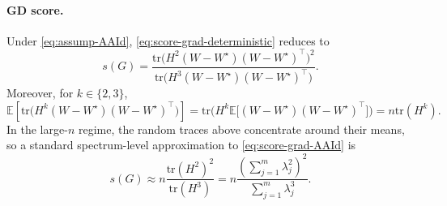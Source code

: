 \documentclass[11pt]{article}
\begin{document}
\paragraph{GD score.}
Under \eqref{eq:assump-AAId}, \eqref{eq:score-grad-deterministic} reduces to
\begin{equation}
  \label{eq:score-grad-AAId}
  s ({G})
   = 
  \frac{
    \mathrm{tr} \Big({H}^2 ({W}-W^\star)({W}-W^\star)^\top\Big)^2
  }{
    \mathrm{tr} \Big({H}^3 ({W}-W^\star)({W}-W^\star)^\top\Big)
  }.
\end{equation}
Moreover, for $k\in\{2,3\}$,
\[
  \mathbb{E} \left[\mathrm{tr} \Big({H}^k ({W}-W^\star)({W}-W^\star)^\top\Big)\right]
   = 
  \mathrm{tr} \Big({H}^k \mathbb{E}\big[({W}-W^\star)({W}-W^\star)^\top\big]\Big)
   = 
  n \mathrm{tr}({H}^k).
\]
In the large-$n$ regime, the random traces above concentrate around their means, so a standard
spectrum-level approximation to \eqref{eq:score-grad-AAId} is
\begin{equation}
  \label{eq:score-grad-spectrum-approx}
  s ({G})
   \approx 
  n \frac{\mathrm{tr}({H}^2)^2}{\mathrm{tr}({H}^3)}
   = 
  n \frac{\left(\sum_{j=1}^{m}\lambda_j^2\right)^2}{\sum_{j=1}^{m}\lambda_j^3}.
\end{equation}
\end{document}
